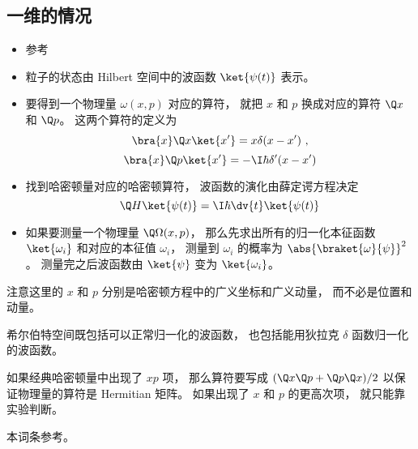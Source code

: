 
\begin{issues}
\issueDraft
\end{issues}



\subsection{一维的情况}
\begin{itemize}
\item 参考 \cite{Shankar}
\item 粒子的状态由 Hilbert 空间中的波函数 $\ket{\psi(t)}$ 表示。
\item 要得到一个物理量 $\omega(x, p)$ 对应的算符， 就把 $x$ 和 $p$ 换成对应的算符 $\Q x$ 和 $\Q p$。 这两个算符的定义为
\begin{equation}
\bra{x}\Q x \ket{x'} = x\delta(x-x')~,
\end{equation}
\begin{equation}
\bra{x}\Q p \ket{x'} = -\I\hbar \delta'(x-x')
\end{equation}
\item 找到哈密顿量对应的哈密顿算符， 波函数的演化由薛定谔方程决定
\begin{equation}
\Q H \ket{\psi(t)} = \I \hbar \dv{t} \ket{\psi(t)}
\end{equation}
\item 如果要测量一个物理量 $\Q\Omega(x, p)$， 那么先求出所有的归一化本征函数 $\ket{\omega_i}$ 和对应的本征值 $\omega_i$， 测量到 $\omega_i$ 的概率为 $\abs{\braket{\omega}{\psi}}^2$。 测量完之后波函数由 $\ket{\psi}$ 变为 $\ket{\omega_i}$。
\end{itemize}

注意这里的 $x$ 和 $p$ 分别是哈密顿方程中的广义坐标和广义动量， 而不必是位置和动量。

希尔伯特空间既包括可以正常归一化的波函数， 也包括能用狄拉克 $\delta$ 函数归一化的波函数。

如果经典哈密顿量中出现了 $xp$ 项， 那么算符要写成 $(\Q x \Q p + \Q p \Q x)/2$ 以保证物理量的算符是 Hermitian 矩阵。 如果出现了 $x$ 和 $p$ 的更高次项， 就只能靠实验判断。

本词条参考\cite{Shankar}。
